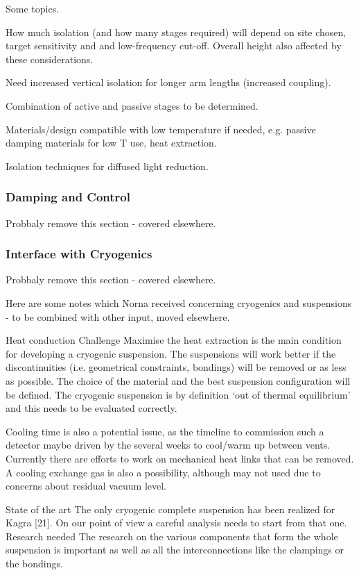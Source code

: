 Some topics.

How much isolation (and how many stages required) will depend on site chosen, target sensitivity and and low-frequency cut-off. Overall height also affected by these considerations.

Need increased vertical isolation for longer arm lengths (increased coupling).

Combination of active and passive stages to be determined.

Materials/design compatible with low temperature if needed, e.g. passive damping materials for low T use, heat extraction.   

Isolation techniques for diffused light reduction.       



\subsubsection{Damping and Control}

Probbaly remove this section - covered elsewhere.

\subsubsection{Interface with Cryogenics}

Probbaly remove this section - covered elsewhere.

Here are some notes which Norna received concerning cryogenics and suspensions - to be combined with other input, moved elsewhere.

Heat conduction
Challenge
Maximise the heat extraction is the main condition for developing a cryogenic suspension. The suspensions will work better if the discontinuities (i.e. geometrical constraints, bondings) will be removed or as less as possible. The choice of the material and the best suspension configuration will be defined. The cryogenic suspension is by definition ‘out of thermal equilibrium’ and this needs to be evaluated correctly.

Cooling time is also a potential issue, as the timeline to commission such a detector maybe driven by the several weeks to cool/warm up between vents. Currently there are efforts to work on mechanical heat links that can be removed. A cooling exchange gas is also a possibility, although may not used due to concerns about residual vacuum level.

State of the art
The only cryogenic complete suspension has been realized for Kagra [21]. On our point of view a careful analysis needs to start from that one.
Research needed
The research on the various components that form the whole suspension is important as well as all the interconnections like the clampings or the bondings. 

